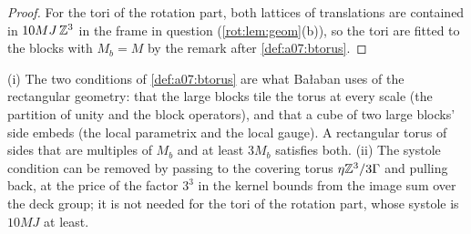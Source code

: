 \begin{proof}
For the tori of the rotation part, both lattices of translations are contained in $10MJ\,\mathbb Z^3$ in the frame in question (\cref{rot:lem:geom}(b)), so the tori are fitted to the blocks with $M_b=M$ by the remark after \cref{def:a07:btorus}.
\end{proof}

\begin{remark}\label{rem:a07:torus}
(i) The two conditions of \cref{def:a07:btorus} are what Ba{\l}aban uses of the rectangular geometry: that the large blocks tile the torus at every scale (the partition of unity and the block operators), and that a cube of two large blocks' side embeds (the local parametrix and the local gauge). A rectangular torus of sides that are multiples of $M_b$ and at least $3M_b$ satisfies both. (ii) The systole condition can be removed by passing to the covering torus $\eta\mathbb Z^3/3\Gamma$ and pulling back, at the price of the factor $3^3$ in the kernel bounds from the image sum over the deck group; it is not needed for the tori of the rotation part, whose systole is $10MJ$ at least.
\end{remark}
